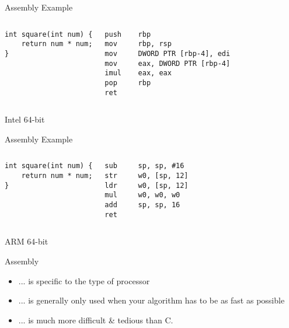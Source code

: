 \documentclass[graphics]{beamer}
\begin{document}
\begin{frame}[fragile]{Assembly Example}
    \begin{columns}
            \begin{verbatim}
int square(int num) {
    return num * num;
}
            \end{verbatim}
            \footnotesize
            \begin{verbatim}
push    rbp
mov     rbp, rsp
mov     DWORD PTR [rbp-4], edi
mov     eax, DWORD PTR [rbp-4]
imul    eax, eax
pop     rbp
ret
            \end{verbatim}
    \end{columns}
    \vfill
    Intel 64-bit
\end{frame}

\begin{frame}[fragile]{Assembly Example}
    \begin{columns}
            \begin{verbatim}
int square(int num) {
    return num * num;
}
            \end{verbatim}
            \footnotesize
            \begin{verbatim}
sub     sp, sp, #16
str     w0, [sp, 12]
ldr     w0, [sp, 12]
mul     w0, w0, w0
add     sp, sp, 16
ret
            \end{verbatim}
    \end{columns}
    \vfill
    ARM 64-bit
\end{frame}

\begin{frame}{Assembly}
    \begin{itemize}
        \item ... is specific to the type of processor
        \item ... is generally only used when your algorithm has to be as fast as possible
        \item ... is much more difficult \& tedious than C.
    \end{itemize}
\end{frame}
\end{document}
